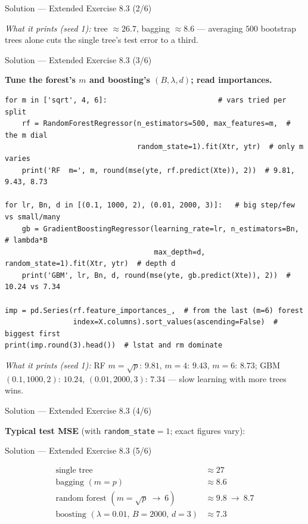 \documentclass[aspectratio=169,11pt]{beamer}
\begin{document}
\begin{frame}{Solution --- Extended Exercise 8.3 (2/6)}
\begin{solutionbox}
\emph{What it prints (seed 1):} tree $\approx26.7$, bagging $\approx8.6$ --- averaging $500$ bootstrap trees alone cuts the single tree's test error to a third.
\end{solutionbox}
\end{frame}

\begin{frame}[fragile]{Solution --- Extended Exercise 8.3 (3/6)}
\begin{solutionbox}
\textbf{Tune the forest's $m$ and boosting's $(B,\lambda,d)$; read importances.}
\begin{lstlisting}[basicstyle=\ttfamily\scriptsize]
for m in ['sqrt', 4, 6]:                          # vars tried per split
    rf = RandomForestRegressor(n_estimators=500, max_features=m,  # the m dial
                               random_state=1).fit(Xtr, ytr)  # only m varies
    print('RF  m=', m, round(mse(yte, rf.predict(Xte)), 2))  # 9.81, 9.43, 8.73

for lr, Bn, d in [(0.1, 1000, 2), (0.01, 2000, 3)]:   # big step/few vs small/many
    gb = GradientBoostingRegressor(learning_rate=lr, n_estimators=Bn,  # lambda*B
                                   max_depth=d, random_state=1).fit(Xtr, ytr)  # depth d
    print('GBM', lr, Bn, d, round(mse(yte, gb.predict(Xte)), 2))  # 10.24 vs 7.34

imp = pd.Series(rf.feature_importances_,  # from the last (m=6) forest
                index=X.columns).sort_values(ascending=False)  # biggest first
print(imp.round(3).head())  # lstat and rm dominate
\end{lstlisting}
\emph{What it prints (seed 1):} RF $m{=}\sqrt p$: $9.81$, $m{=}4$: $9.43$, $m{=}6$: $8.73$; GBM $(0.1,1000,2)$: $10.24$, $(0.01,2000,3)$: $7.34$ --- slow learning with more trees wins.
\end{solutionbox}
\end{frame}

\begin{frame}{Solution --- Extended Exercise 8.3 (4/6)}
\begin{solutionbox}
\textbf{Typical test MSE} (with \texttt{random\_state}${=}1$; exact figures vary):
\end{solutionbox}
\end{frame}

\begin{frame}{Solution --- Extended Exercise 8.3 (5/6)}
\begin{solutionbox}
\[
\begin{array}{l|c}
\text{single tree} & \approx 27\\
\text{bagging } (m=p) & \approx 8.6\\
\text{random forest } (m=\sqrt p \ \to\ 6) & \approx 9.8\ \to\ 8.7\\
\text{boosting } (\lambda{=}0.01,\,B{=}2000,\,d{=}3) & \approx 7.3
\end{array}
\]
\end{solutionbox}
\end{frame}
\end{document}
